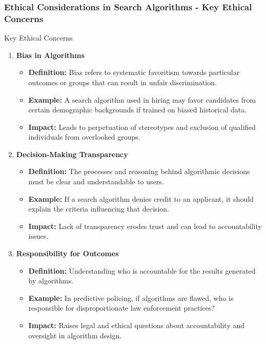 \documentclass[aspectratio=169]{beamer}
\begin{document}
\begin{frame}[fragile]
    \frametitle{Ethical Considerations in Search Algorithms - Key Ethical Concerns}
    \begin{block}{Key Ethical Concerns}
        \begin{enumerate}
            \item \textbf{Bias in Algorithms}
                \begin{itemize}
                    \item \textbf{Definition:} Bias refers to systematic favoritism towards particular outcomes or groups that can result in unfair discrimination.
                    \item \textbf{Example:} A search algorithm used in hiring may favor candidates from certain demographic backgrounds if trained on biased historical data.
                    \item \textbf{Impact:} Leads to perpetuation of stereotypes and exclusion of qualified individuals from overlooked groups.
                \end{itemize}
                
            \item \textbf{Decision-Making Transparency}
                \begin{itemize}
                    \item \textbf{Definition:} The processes and reasoning behind algorithmic decisions must be clear and understandable to users.
                    \item \textbf{Example:} If a search algorithm denies credit to an applicant, it should explain the criteria influencing that decision.
                    \item \textbf{Impact:} Lack of transparency erodes trust and can lead to accountability issues.
                \end{itemize}
                
            \item \textbf{Responsibility for Outcomes}
                \begin{itemize}
                    \item \textbf{Definition:} Understanding who is accountable for the results generated by algorithms.
                    \item \textbf{Example:} In predictive policing, if algorithms are flawed, who is responsible for disproportionate law enforcement practices?
                    \item \textbf{Impact:} Raises legal and ethical questions about accountability and oversight in algorithm design.
                \end{itemize}
        \end{enumerate}
    \end{block}
\end{frame}
\end{document}

